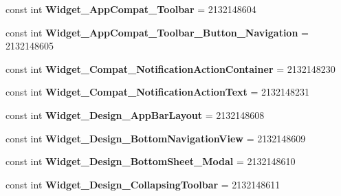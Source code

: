 \begin{DoxyCompactItemize}
\item 
\mbox{\label{classst_delivery_1_1_resource_1_1_style_a5e2e1bb7b9c1d4c0bea5716fb780bf98}} 
const int {\bfseries Widget\+\_\+\+App\+Compat\+\_\+\+Toolbar} = 2132148604
\item 
\mbox{\label{classst_delivery_1_1_resource_1_1_style_aab6ed58eb73639cdc7684926177b6e06}} 
const int {\bfseries Widget\+\_\+\+App\+Compat\+\_\+\+Toolbar\+\_\+\+Button\+\_\+\+Navigation} = 2132148605
\item 
\mbox{\label{classst_delivery_1_1_resource_1_1_style_ac7b9ed583e422cb5bba5b9ba33b4db1d}} 
const int {\bfseries Widget\+\_\+\+Compat\+\_\+\+Notification\+Action\+Container} = 2132148230
\item 
\mbox{\label{classst_delivery_1_1_resource_1_1_style_a7837f611e5c31fb5c39c51fda0d5021a}} 
const int {\bfseries Widget\+\_\+\+Compat\+\_\+\+Notification\+Action\+Text} = 2132148231
\item 
\mbox{\label{classst_delivery_1_1_resource_1_1_style_a02ea9685271fc50d05ed2de87aed03b8}} 
const int {\bfseries Widget\+\_\+\+Design\+\_\+\+App\+Bar\+Layout} = 2132148608
\item 
\mbox{\label{classst_delivery_1_1_resource_1_1_style_afa0dcc2b9925e212aba0898c911b1f14}} 
const int {\bfseries Widget\+\_\+\+Design\+\_\+\+Bottom\+Navigation\+View} = 2132148609
\item 
\mbox{\label{classst_delivery_1_1_resource_1_1_style_af31554f12791c5dab0412347efed7ad3}} 
const int {\bfseries Widget\+\_\+\+Design\+\_\+\+Bottom\+Sheet\+\_\+\+Modal} = 2132148610
\item 
\mbox{\label{classst_delivery_1_1_resource_1_1_style_a8a16dd97ddcd2c64efb2092a7d0eb659}} 
const int {\bfseries Widget\+\_\+\+Design\+\_\+\+Collapsing\+Toolbar} = 2132148611
\item 
\mbox{\label{classst_delivery_1_1_resource_1_1_style_afeae45ccaba18f60e8072942a40d0cbb}} 

\end{DoxyCompactItemize}
